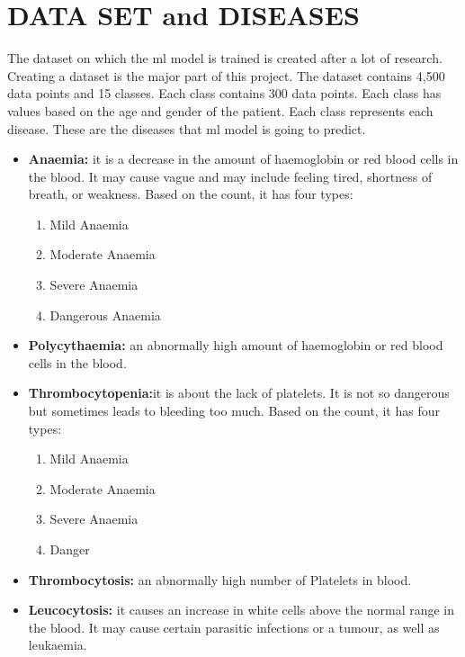 \documentclass[twocolumn]{article}
\begin{document}
\section{DATA SET and DISEASES}
The dataset on which the ml model is trained is created after a lot of research. Creating a dataset is the major part of this project. The dataset contains 4,500 data points and 15 classes. Each class contains 300 data points. Each class has values based on the age and gender of the patient. Each class represents each disease.
These are the diseases that ml model is going to predict.\cite{Safavian1991}
\begin{itemize}


\item\textbf{Anaemia:} it is a decrease in the amount of haemoglobin or red blood cells in the blood. It may cause vague and may include feeling tired, shortness of breath, or weakness.\cite{Cabitza2017}
Based on the count, it has four types:

\begin{enumerate}
\item Mild Anaemia
\item Moderate Anaemia
\item Severe Anaemia
\item Dangerous Anaemia
\end{enumerate}

\item\textbf{Polycythaemia:} an abnormally high amount of haemoglobin or red blood cells in the blood. 
\item\textbf{Thrombocytopenia:}it is about the lack of platelets. It is not so dangerous but sometimes leads to bleeding too much.
Based on the count, it has four types:

\begin{enumerate}
\item Mild Anaemia
\item Moderate Anaemia
\item Severe Anaemia
\item Danger
\end{enumerate}

\item\textbf{Thrombocytosis:} an abnormally high number of Platelets in blood.

\item\textbf{Leucocytosis:} it causes an increase in white cells above the normal range in the blood. It may cause certain parasitic infections or a tumour, as well as leukaemia. 


\end{itemize}
\end{document}
